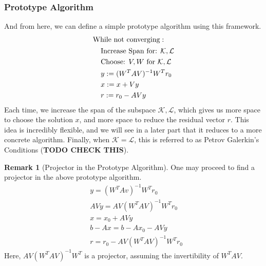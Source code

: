 \documentclass[]{article}
\theoremstyle{definition}
\newtheorem{remark}{Remark}[subsection]  %
\begin{document}
        \subsubsection{Prototype Algorithm}
            And from here, we can define a simple prototype algorithm using this framework. 
            \begin{align}
                \begin{aligned}
                    & \text{While not converging}: 
                    \\&\hspace{1.1em}
                            \begin{aligned}
                            &\text{Increase Span for: } \mathcal{K, L}
                            \\
                            &\text{Choose: } V, W \text{ for } \mathcal{K}, \mathcal{L}
                            \\
                            & y:= (W^TAV)^{-1}W^Tr_0
                            \\
                            & x:= x+ Vy
                            \\
                            & r:= r_0 - AVy
                        \end{aligned}
                \end{aligned}
            \end{align}
            Each time, we increase the span of the subspace $\mathcal K, \mathcal L$, which gives us more space to choose the solution $x$, and more space to reduce the residual vector $r$. This idea is incredibly flexible, and we will see in a later part that it reduces to a more concrete algorithm. Finally, when $\mathcal K = \mathcal L$, this is referred to as Petrov Galerkin's Conditions (\textbf{TODO CHECK THIS}). 
            \\
            \begin{remark}[Projector in the Prototype Algorithm]
                One may proceed to find a projector in the above prototype algorithm. 
                \begin{align}
                    & y = (W^TAv)^{-1}W^Tr_0
                    \\
                    & AVy = AV(W^TAV)^{-1}W^{T}r_0
                    \\
                    & x = x_0 + AVy
                    \\
                    & b - Ax = b - Ax_0 - AVy
                    \\
                    & r = r_0 - AV(W^TAV)^{-1}W^Tr_0
                \end{align}
                Here, $AV(W^TAV)^{-1}W^T$ is a projector, assuming the invertibility of $W^TAV$. 
            \end{remark}
        
\end{document}
